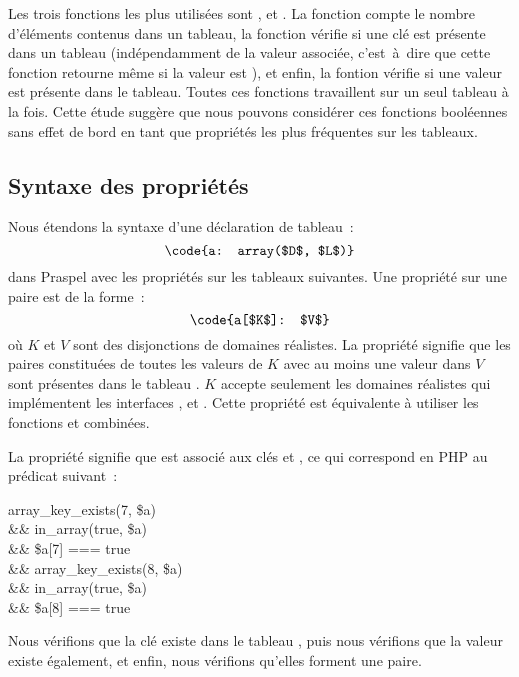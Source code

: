 %
Les trois fonctions les plus utilisées sont ,
 et . La fonction 
compte le nombre d'éléments contenus dans un tableau, la fonction
 vérifie si une clé est présente dans un tableau
(indépendamment de la valeur associée, c'est~à~dire que cette fonction retourne
 même si la valeur est ), et enfin, la fontion
 vérifie si une valeur est présente dans le tableau. Toutes
ces fonctions travaillent sur un seul tableau à la fois. Cette étude suggère que
nous pouvons considérer ces fonctions booléennes sans effet de bord en tant que
propriétés les plus fréquentes sur les tableaux.

\subsection{Syntaxe des propriétés}

Nous étendons la syntaxe d'une déclaration de tableau~:
%
$$\code{a: array($D$, $L$)}$$
%
dans Praspel avec les propriétés sur les tableaux suivantes. Une propriété sur
une paire est de la forme~:
%
$$\code{a[$K$]: $V$}$$
%
où $K$ et $V$ sont des disjonctions de domaines réalistes. La propriété signifie
que les paires constituées de toutes les valeurs de $K$ avec au moins une valeur
dans $V$ sont présentes dans le tableau . $K$ accepte seulement les
domaines réalistes qui implémentent les interfaces ,
 et . Cette propriété est équivalente à utiliser
les fonctions  et  combinées.

\begin{example}

La propriété  signifie que  est associé aux clés
 et , ce qui correspond en PHP au prédicat suivant~:
%
\begin{pre}
   array\_key\_exists(7, \$a) \\
\&\& in\_array(true, \$a) \\
\&\& \$a[7] === true \\
\&\& array\_key\_exists(8, \$a) \\
\&\& in\_array(true, \$a) \\
\&\& \$a[8] === true
\end{pre}
%
Nous vérifions que la clé  existe dans le tableau , puis nous
vérifions que la valeur  existe également, et enfin, nous vérifions
qu'elles forment une paire.

\end{example}

